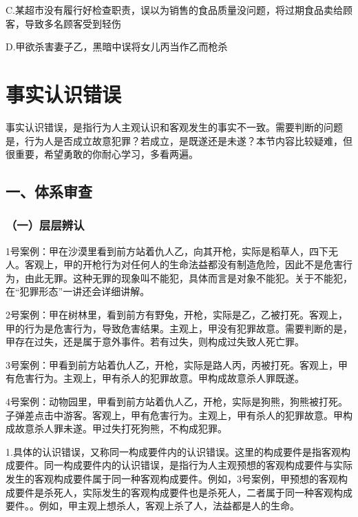 C.某超市没有履行好检查职责，误以为销售的食品质量没问题，将过期食品卖给顾客，导致多名顾客受到轻伤

D.甲欲杀害妻子乙，黑暗中误将女儿丙当作乙而枪杀

\section{事实认识错误}

事实认识错误，是指行为人主观认识和客观发生的事实不一致。需要判断的问题是，行为人是否成立故意犯罪？若成立，是既遂还是未遂？本节内容比较疑难，但很重要，希望勇敢的你耐心学习，多看两遍。

\subsection*{一、体系审查}

\subsubsection*{（一）层层辨认}


1号案例：甲在沙漠里看到前方站着仇人乙，向其开枪，实际是稻草人，四下无人。客观上，甲的开枪行为对任何人的生命法益都没有制造危险，因此不是危害行为，由此无罪。这种无罪的现象叫不能犯，具体而言是对象不能犯。关于不能犯，在“犯罪形态”一讲还会详细讲解。

2号案例：甲在树林里，看到前方有野兔，开枪，实际是乙，乙被打死。客观上，甲的行为是危害行为，导致危害结果。主观上，甲没有犯罪故意。需要判断的是，甲存在过失，还是属于意外事件。若有过失，则构成过失致人死亡罪。

3号案例：甲看到前方站着仇人乙，开枪，实际是路人丙，丙被打死。客观上，甲有危害行为。主观上，甲有杀人的犯罪故意。甲构成故意杀人罪既遂。

4号案例：动物园里，甲看到前方站着仇人乙，开枪，实际是狗熊，狗熊被打死。子弹差点击中游客。客观上，甲有危害行为。主观上，甲有杀人的犯罪故意。甲构成故意杀人罪未遂。甲过失打死狗熊，不构成犯罪。

1.具体的认识错误，又称同一构成要件内的认识错误。这里的构成要件是指客观构成要件。同一构成要件内的认识错误，是指行为人主观预想的客观构成要件与实际发生的客观构成要件属于同一种客观构成要件。例如，3号案例，甲预想的客观构成要件是杀死人，实际发生的客观构成要件也是杀死人，二者属于同一种客观构成要件。。例如，甲主观上想杀人，客观上杀了人，法益都是人的生命。

